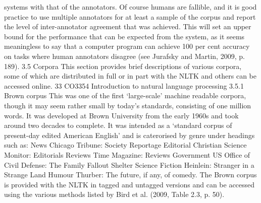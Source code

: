 systems with that of the annotators. Of course humans are fallible, and it is good
practice to use multiple annotators for at least a sample of the corpus and report the
level of inter-annotator agreement that was achieved. This will set an upper bound
for the performance that can be expected from the system, as it seems meaningless
to say that a computer program can achieve 100 per cent accuracy on tasks where
human annotators disagree (see Jurafsky and Martin, 2009, p. 189).
3.5 Corpora
This section provides brief descriptions of various corpora, some of which are
distributed in full or in part with the NLTK and others can be accessed online.
33
CO3354 Introduction to natural language processing
3.5.1 Brown corpus
This was one of the first ‘large-scale’ machine readable corpora, though it may seem
rather small by today’s standards, consisting of one million words. It was developed
at Brown University from the early 1960s and took around two decades to complete.
It was intended as a ‘standard corpus of present-day edited American English’ and is
caterorised by genre under headings such as:
News Chicago Tribune: Society Reportage
Editorial Christian Science Monitor: Editorials
Reviews Time Magazine: Reviews
Government US Office of Civil Defense: The Family Fallout Shelter
Science Fiction Heinlein: Stranger in a Strange Land
Humour Thurber: The future, if any, of comedy.
The Brown corpus is provided with the NLTK in tagged and untagged versions and
can be accessed using the various methods listed by Bird et al. (2009, Table 2.3,
p. 50).
